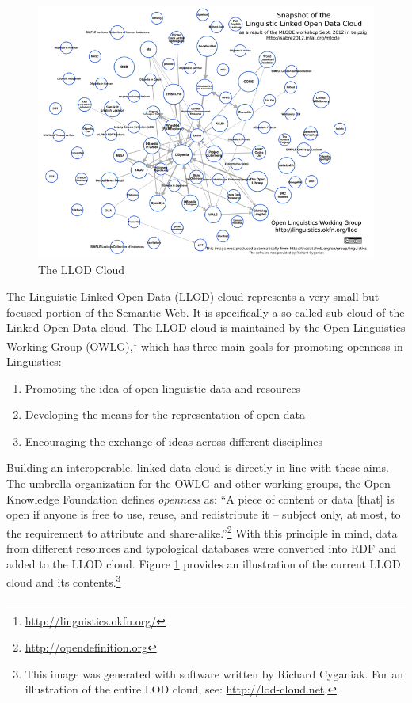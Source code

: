 \begin{figure}[t!hpb]
\caption{The LLOD Cloud}\label{f1}
\includegraphics[width=15cm,keepaspectratio]{llod.png}
\end{figure}

The Linguistic Linked Open Data (LLOD) cloud represents a very small but focused portion of the Semantic Web. It is specifically a so-called sub-cloud of the Linked Open Data cloud. The LLOD cloud is maintained by the Open Linguistics Working Group (OWLG),\footnote{\url{http://linguistics.okfn.org/}} which has three main goals for promoting openness in Linguistics: 

\begin{enumerate} 
	\item Promoting the idea of open linguistic data and resources
	\item Developing the means for the representation of open data
	\item Encouraging the exchange of ideas across different disciplines 
\end{enumerate}

Building an interoperable, linked data cloud is directly in line with these aims. The umbrella organization for the OWLG and other working groups, the Open Knowledge Foundation defines \textit{openness} as: ``A piece of content or data [that] is open if anyone is free to use, reuse, and redistribute it -- subject only, at most, to the requirement to attribute and share-alike.''\footnote{\url{http://opendefinition.org}} With this principle in mind, data from different resources and typological databases were converted into RDF and added to the LLOD cloud. Figure \ref{f1} provides an illustration of the current LLOD cloud and its contents.\footnote{This image was generated with software written by Richard Cyganiak. For an illustration of the entire LOD cloud, see: \url{http://lod-cloud.net}.}

